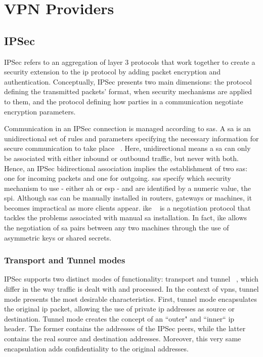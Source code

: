 \documentclass[11pt,twoside,a4paper]{report}
\begin{document}
\section{VPN Providers}

\subsection{IPSec}

IPSec refers to an aggregation of layer 3 protocols that work together to create a security extension to the \ac{ip} protocol by adding packet encryption and authentication. Conceptually, IPSec presents two main dimensions: the protocol defining the transmitted packets' format, when security mechanisms are applied to them, and the protocol defining how parties in a communication negotiate encryption parameters.

Communication in an IPSec connection is managed according to \acp{sa}. A \ac{sa} is an unidirectional set of rules and parameters specifying the necessary information for secure communication to take place ~\cite{rfc4301}. Here, unidirectional means a \ac{sa} can only be associated with either inbound or outbound traffic, but never with both. Hence, an IPSec bidirectional association implies the establishment of two \acp{sa}: one for incoming packets and one for outgoing. \acp{sa} specify which security mechanism to use - either \ac{ah} or \ac{esp} - and are identified by a numeric value, the \ac{spi}. Although \ac{sa}s can be manually installed in routers, gateways or machines, it becomes impractical as more clients appear. \ac{ike} ~\cite{rfc7296} is a negotiation protocol that tackles the problems associated with manual \ac{sa} installation. In fact, \ac{ike} allows the negotiation of \ac{sa} pairs between any two machines through the use of asymmetric keys or shared secrets.

\subsubsection{Transport and Tunnel modes}

IPSec supports two distinct modes of functionality: transport and tunnel ~\cite{rfc4301}, which differ in the way traffic is dealt with and processed. In the context of \acp{vpn}, tunnel mode presents the
most desirable characteristics. First, tunnel mode encapsulates the original \ac{ip} packet, allowing the use of private \ac{ip} addresses as source or destination. Tunnel mode creates the concept of an ``outer" and ``inner`` \ac{ip} header. The former contains the addresses of the IPSec peers, while the latter contains the real source and destination addresses. Moreover, this very same encapsulation adds confidentiality to the original addresses.
\end{document}
